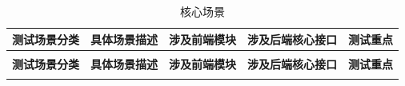 \begin{levellist}
\begin{levellist}
\begin{longtable}{>{\centering\arraybackslash}m{1cm} >{\centering\arraybackslash}m{5cm} >{\centering\arraybackslash}m{2cm} >{\centering\arraybackslash}m{2.5cm} >{\centering\arraybackslash}m{2cm}}
            \caption{核心场景} \label{tab:training}                                                                                                                                                                                                \\

            \toprule
            \textbf{测试场景分类} & \textbf{具体场景描述}                                                                       & \textbf{涉及前端模块}            & \textbf{涉及后端核心接口}                                                   & \textbf{测试重点}         \\
            \midrule
            \endfirsthead

            \multicolumn{5}{c}{{\tablename\ \thetable{} 续表}}                                                                                                                                                                                   \\
            \toprule
            \textbf{测试场景分类} & \textbf{具体场景描述}                                                                       & \textbf{涉及前端模块}            & \textbf{涉及后端核心接口}                                                   & \textbf{测试重点}         \\
            \midrule
            \endhead

            \bottomrule
            \endfoot



\end{longtable}
\end{levellist}
\end{levellist}
